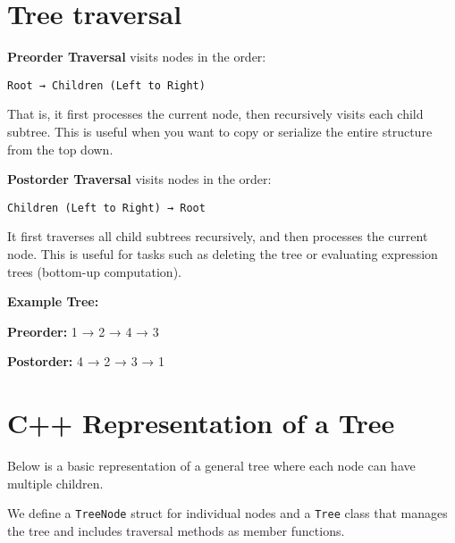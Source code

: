 \documentclass{article}
\begin{document}
\section{Tree traversal}

\textbf{Preorder Traversal} visits nodes in the order:

\begin{center}
\texttt{Root → Children (Left to Right)}
\end{center}

That is, it first processes the current node, then recursively visits each child subtree. This is useful when you want to copy or serialize the entire structure from the top down.

\textbf{Postorder Traversal} visits nodes in the order:

\begin{center}
\texttt{Children (Left to Right) → Root}
\end{center}

It first traverses all child subtrees recursively, and then processes the current node. This is useful for tasks such as deleting the tree or evaluating expression trees (bottom-up computation).

\textbf{Example Tree:}

\begin{center}
\end{center}


\textbf{Preorder:} 1 → 2 → 4 → 3

\textbf{Postorder:} 4 → 2 → 3 → 1

\section{C++ Representation of a Tree}

Below is a basic representation of a general tree where each node can have multiple children.

We define a \texttt{TreeNode} struct for individual nodes and a \texttt{Tree} class that manages the tree and includes traversal methods as member functions.
\end{document}
